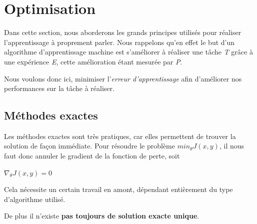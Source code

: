 \documentclass[a4paper, 10pt]{report}
\begin{document}
\section{Optimisation}
Dans cette section, nous aborderons les grands principes utilisés pour réaliser l'apprentissage à proprement parler.
Nous rappelons qu'en effet le but d'un algorithme d'apprentissage machine est s'améliorer à réaliser une tâche \emph{T} grâce à une expérience \emph{E}, cette amélioration étant mesurée par \emph{P}.

Nous voulons donc ici, minimiser l'\emph{erreur d'apprentissage} afin d'améliorer nos performances sur la tâche à réaliser.
\subsection{Méthodes exactes}
Les méthodes exactes sont très pratiques, car elles permettent de trouver la solution de façon immédiate.
Pour résoudre le problème $min_{\theta}J(x,y)$, il nous faut donc annuler le gradient de la fonction de perte, soit
\begin{center}
	$\nabla_{\theta} J(x,y) = 0$
\end{center}
Cela nécessite un certain travail en amont, dépendant entièrement du type d'algorithme utilisé.

De plus il n'existe \textbf{pas toujours de solution exacte unique}.
\end{document}
